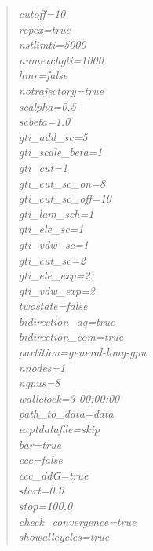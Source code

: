 \documentclass[11pt,letterpaper,titlepage]{article}
\newenvironment{itquote}
  {\begin{quote}\itshape}
  {\end{quote}\ignorespacesafterend}
\begin{document}
\begin{itquote}
{cutoff=10               			\\
repex=true 					\\
nstlimti=5000           			\\
numexchgti=1000         			\\
hmr=false 					\\
notrajectory=true				\\
scalpha=0.5             			\\
scbeta=1.0              			\\
gti\_add\_sc=5 					\\
gti\_scale\_beta=1      			\\
gti\_cut=1              			\\
gti\_cut\_sc\_on=8      			\\
gti\_cut\_sc\_off=10    			\\
gti\_lam\_sch=1         			\\
gti\_ele\_sc=1          			\\
gti\_vdw\_sc=1          			\\
gti\_cut\_sc=2          			\\
gti\_ele\_exp=2         			\\
gti\_vdw\_exp=2         			\\

twostate=false 					\\
bidirection\_aq=true 				\\
bidirection\_com=true 				\\

partition=general-long-gpu       		\\
nnodes=1                        		\\
ngpus=8                        			\\
wallclock=3-00:00:00          			\\

path\_to\_data=data 				\\
exptdatafile=skip 				\\
bar=true 					\\
ccc=false 					\\
ccc\_ddG=true 					\\
start=0.0 					\\
stop=100.0 					\\
check\_convergence=true 			\\
showallcycles=true 				\\

}

\end{itquote}
\end{document}
